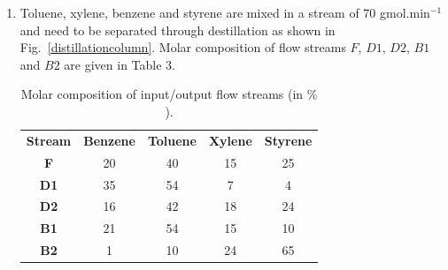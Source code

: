 \documentclass[12pts,a4paper,amsmath,amssymb,floatfix]{article}%
\renewcommand\leq{\leqslant}
\begin{document}
\begin{enumerate}[label=\bfseries Problem \arabic*:]
\begin{enumerate}[label=\bfseries Task \arabic*]
\item\label{Practical1:Task3} Using the van der Waals EOS, calculate the molar volume ($V$) and compressibility factor ($Z$) of gaseous ammonia at 0.01 $\leq P_{r} \leq$ 1.50 and 450 K. Plot $P_{r}\times Z$ and $P_{r}\times V$.\hfill{\bf[23 Marks]}

\end{enumerate}

\item Toluene, xylene, benzene and styrene are mixed in a stream of 70 gmol.min$^{-1}$ and need to be separated through destillation as shown in Fig.~\ref{distillationcolumn}. Molar composition of flow streams $F$, $D1$, $D2$, $B1$ and $B2$ are given in Table 3.%

\begin{table}[h]\label{Table3}
\begin{center}
\begin{tabular}{||c | c c c c ||} 
\hline\hline
 {\bf Stream} & {\bf Benzene} & {\bf Toluene} & {\bf Xylene} & {\bf Styrene} \\
    {\bf F}   &   20          &    40         & 15           & 25            \\
\hline
    {\bf D1}  &   35          &    54         & 7            & 4             \\
    {\bf D2}  &   16          &    42         & 18           & 24            \\
\hline
    {\bf B1}  &   21          &    54         & 15           & 10            \\
    {\bf B2}  &   1           &    10         & 24           & 65            \\
\hline\hline
\end{tabular}
\caption{Molar composition of input/output flow streams (in $\%$). }
\end{center}
\end{table}


\end{enumerate}
\end{document}
